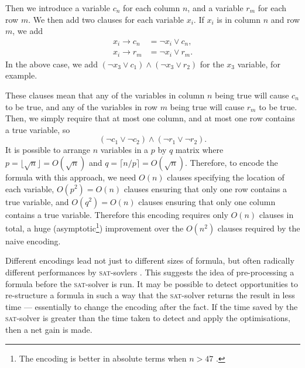 \documentclass[proof,pdftex,11pt,a4,titlepage]{article}
\newcommand{\sat}{\textsc{sat}}
\begin{document}
Then we introduce a variable $c_n$ for each column $n$, and a variable $r_m$ for each row $m$. We then add two clauses for each variable $x_i$. If $x_i$ is in column $n$ and row $m$, we add
\begin{align*}
  x_i \to c_n &= \neg x_i \vee c_n, \\
  x_i \to r_m &= \neg x_i \vee r_m.
\end{align*}
In the above case, we add $(\neg x_3 \vee c_1) \wedge (\neg x_3 \vee r_2)$ for the $x_3$ variable, for example.

These clauses mean that any of the variables in column $n$ being true will cause $c_n$ to be true, and any of the variables in row $m$ being true will cause $r_m$ to be true. Then, we simply require that at most one column, and at most one row contains a true variable, so
\[(\neg c_1 \vee \neg c_2) \wedge (\neg r_1 \vee \neg r_2).\]
It is possible to arrange $n$ variables in a $p$ by $q$ matrix where $p = \lfloor \sqrt{n} \rfloor = O(\sqrt{n})$ and $q = \lceil n / p \rceil = O(\sqrt{n})$. Therefore, to encode the formula with this approach, we need $O(n)$ clauses specifying the location of each variable, $O(p^2)=O(n)$ clauses ensuring that only one row contains a true variable, and $O(q^2)=O(n)$ clauses ensuring that only one column contains a true variable. Therefore this encoding requires only $O(n)$ clauses in total, a huge (asymptotic\footnote{The encoding is better in absolute terms when $n>47$ \cite{Biere:2014}.}) improvement over the $O(n^2)$ clauses required by the naive encoding.

Different encodings lead not just to different sizes of formula, but often radically different performances by \sat{}-sovlers \cite{Martins:2011}. This suggests the idea of pre-processing a formula before the \sat{}-solver is run. It may be possible to detect opportunities to re-structure a formula in such a way that the \sat{}-solver returns the result in less time --- essentially to change the encoding after the fact. If the time saved by the \sat{}-solver is greater than the time taken to detect and apply the optimisations, then a net gain is made.
\end{document}
